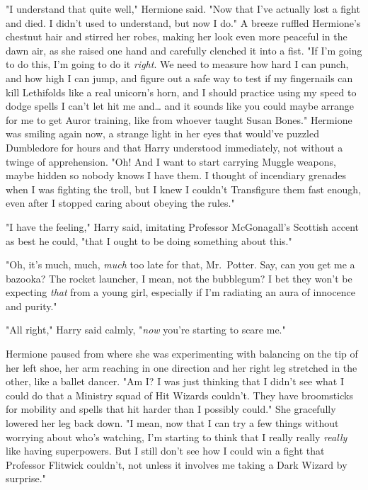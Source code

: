 "I understand that quite well," Hermione said. "Now that I've actually lost a
fight and died. I didn't used to understand, but now I do." A breeze ruffled
Hermione's chestnut hair and stirred her robes, making her look even more
peaceful in the dawn air, as she raised one hand and carefully clenched it into
a fist. "If I'm going to do this, I'm going to do it \emph{right}. We need to
measure how hard I can punch, and how high I can jump, and figure out a safe
way to test if my fingernails can kill Lethifolds like a real unicorn's horn,
and I should practice using my speed to dodge spells I can't let hit me
and{\ldots} and it sounds like you could maybe arrange for me to get Auror
training, like from whoever taught Susan Bones." Hermione was smiling again
now, a strange light in her eyes that would've puzzled Dumbledore for hours and
that Harry understood immediately, not without a twinge of apprehension. "Oh!
And I want to start carrying Muggle weapons, maybe hidden so nobody knows I
have them. I thought of incendiary grenades when I was fighting the troll, but
I knew I couldn't Transfigure them fast enough, even after I stopped caring
about obeying the rules."

"I have the feeling," Harry said, imitating Professor McGonagall's Scottish
accent as best he could, "that I ought to be doing something about this."

"Oh, it's much, much, \emph{much} too late for that, Mr.~Potter. Say, can you get me a bazooka? The rocket launcher, I mean, not the bubblegum? I bet they won't be
expecting \emph{that} from a young girl, especially if I'm radiating an aura of
innocence and purity."

"All right," Harry said calmly, "\emph{now} you're starting to scare me."

Hermione paused from where she was experimenting with balancing on the tip of
her left shoe, her arm reaching in one direction and her right leg stretched in
the other, like a ballet dancer. "Am I? I was just thinking that I didn't see
what I could do that a Ministry squad of Hit Wizards couldn't. They have
broomsticks for mobility and spells that hit harder than I possibly could." She
gracefully lowered her leg back down. "I mean, now that I can try a few things
without worrying about who's watching, I'm starting to think that I really
really \emph{really} like having superpowers. But I still don't see how I could
win a fight that Professor Flitwick couldn't, not unless it involves me taking
a Dark Wizard by surprise."

